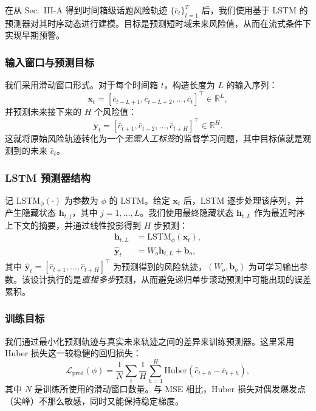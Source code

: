 \documentclass[conference]{IEEEtran}
\begin{document}
在从 Sec.~III-A 得到时间箱级话题风险轨迹 $\{\bar{c}_t\}_{t=1}^{T}$ 后，我们使用基于 LSTM 的预测器对其时序动态进行建模。目标是预测短时域未来风险值，从而在流式条件下实现早期预警。

\subsubsection{输入窗口与预测目标}

我们采用滑动窗口形式。对于每个时间箱 $t$，构造长度为 $L$ 的输入序列：
\begin{equation}
\mathbf{x}_t = [\bar{c}_{t-L+1},\bar{c}_{t-L+2},\dots,\bar{c}_{t}]^\top \in \mathbb{R}^{L},
\label{eq:lstm_input_window}
\end{equation}
并预测未来接下来的 $H$ 个风险值：
\begin{equation}
\mathbf{y}_t = [\bar{c}_{t+1},\bar{c}_{t+2},\dots,\bar{c}_{t+H}]^\top \in \mathbb{R}^{H}.
\label{eq:lstm_target_window}
\end{equation}
这就将原始风险轨迹转化为一个\emph{无需人工标签}的监督学习问题，其中目标值就是观测到的未来 $\bar{c}_t$。

\subsubsection{LSTM 预测器结构}

记 $\mathrm{LSTM}_\phi(\cdot)$ 为参数为 $\phi$ 的 LSTM。给定 $\mathbf{x}_t$ 后，LSTM 逐步处理该序列，并产生隐藏状态 $\mathbf{h}_{t,j}$，其中 $j=1,\dots,L$。我们使用最终隐藏状态 $\mathbf{h}_{t,L}$ 作为最近时序上下文的摘要，并通过线性投影得到 $H$ 步预测：
\begin{align}
\mathbf{h}_{t,L} &= \mathrm{LSTM}_\phi(\mathbf{x}_t), \\
\hat{\mathbf{y}}_t &= W_o \mathbf{h}_{t,L} + \mathbf{b}_o,
\label{eq:lstm_multistep_head}
\end{align}
其中 $\hat{\mathbf{y}}_t = [\hat{c}_{t+1},\dots,\hat{c}_{t+H}]^\top$ 为预测得到的风险轨迹，$(W_o,\mathbf{b}_o)$ 为可学习输出参数。该设计执行的是\emph{直接多步}预测，从而避免递归单步滚动预测中可能出现的误差累积。

\subsubsection{训练目标}

我们通过最小化预测轨迹与真实未来轨迹之间的差异来训练预测器。这里采用 Huber 损失这一较稳健的回归损失：
\begin{equation}
\mathcal{L}_{\text{pred}}(\phi) = \frac{1}{N}\sum_{t}\frac{1}{H}\sum_{h=1}^{H}
\mathrm{Huber}\!\left(\hat{c}_{t+h}-\bar{c}_{t+h}\right),
\label{eq:lstm_loss}
\end{equation}
其中 $N$ 是训练所使用的滑动窗口数量。与 MSE 相比，Huber 损失对偶发爆发点（尖峰）不那么敏感，同时又能保持稳定梯度。
\end{document}
